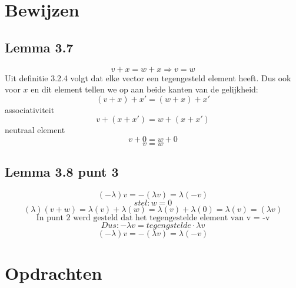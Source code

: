 \documentclass[10pt,a4paper]{article}
\begin{document}
\section*{Bewijzen}
\subsection*{Lemma 3.7}
$$v+x = w + x \Rightarrow v=w$$
Uit definitie 3.2.4 volgt dat elke vector een tegengesteld element heeft. Dus ook voor $x$ en dit element tellen we op aan beide kanten van de gelijkheid:
$$(v+x)+x' = (w + x) + x'$$
associativiteit
\[
v+(x+x') = w + (x + x')
\]
neutraal element
\[
v + 0 = w + 0
\]
\[
v = w
\]

\subsection*{Lemma 3.8 punt 3}
\[(-\lambda)v = -(\lambda v) = \lambda(-v)\]
\[stel:w=0\]
\[(\lambda)(v+w) = \lambda(v) + \lambda(w) = \lambda(v) + \lambda(0) = \lambda(v) = (\lambda v) \]
\[\text{In punt 2 werd gesteld dat het tegengestelde element van v = -v}\]
\[Dus: -\lambda v = tegengstelde \cdot \lambda v\]
\[(-\lambda)v = -(\lambda v) = \lambda(-v) \]


\section*{Opdrachten}
\end{document}
